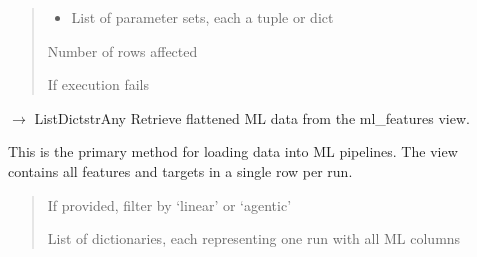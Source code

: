 \documentclass[letterpaper,10pt,english]{sphinxmanual}
\begin{document}
\begin{fulllineitems}
\begin{fulllineitems}
\begin{quote}
\begin{description}
\begin{itemize}
\item {} 
\sphinxAtStartPar
{} \textendash{} List of parameter sets, each a tuple or dict

\end{itemize}

\sphinxAtStartPar
Number of rows affected

\sphinxAtStartPar
{\hyperref[\detokenize{core.database.base:core.database.base.DatabaseError}]{}} \textendash{} If execution fails

\end{description}\end{quote}

\end{fulllineitems}


\begin{fulllineitems}
\label{\detokenize{core.database.base:core.database.base.DatabaseInterface.get_ml_data}}
\pysigstartsignatures
\pysiglinewithargsret
{}
{}
{{ $\rightarrow$ List\DUrole{p}{{[}}Dict\DUrole{p}{{[}}strAny\DUrole{p}{{]}}\DUrole{p}{{]}}}}
\pysigstopsignatures
\sphinxAtStartPar
Retrieve flattened ML data from the ml\_features view.

\sphinxAtStartPar
This is the primary method for loading data into ML pipelines.
The view contains all features and targets in a single row per run.
\begin{quote}\begin{description}
\sphinxAtStartPar
{} \textendash{} If provided, filter by ‘linear’ or ‘agentic’

\sphinxAtStartPar
List of dictionaries, each representing one run with all ML columns

\end{description}\end{quote}


\end{fulllineitems}
\end{fulllineitems}
\end{document}
